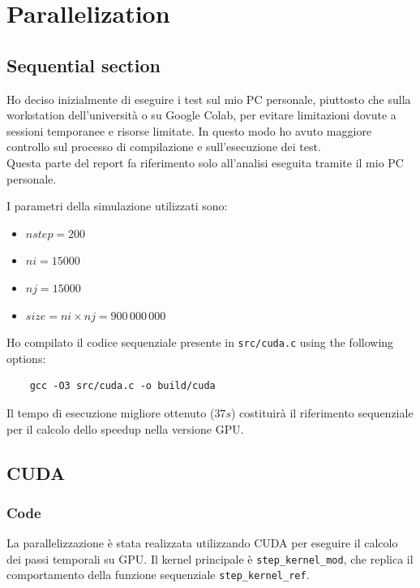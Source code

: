 \newpage
\section{Parallelization}
\label{sec:parallelization}

\subsection{Sequential section}
Ho deciso inizialmente di eseguire i test sul mio PC personale, piuttosto che sulla workstation dell'università o su Google Colab, per evitare limitazioni dovute a sessioni temporanee e risorse limitate. In questo modo ho avuto maggiore controllo sul processo di compilazione e sull'esecuzione dei test.\\

\noindent
Questa parte del report fa riferimento solo all'analisi eseguita tramite il mio PC personale.

\noindent
I parametri della simulazione utilizzati sono:

\begin{itemize}
    \item $nstep = 200$
    \item $ni = 15000$
    \item $nj = 15000$
    \item $size = ni \times nj = 900\,000\,000$
\end{itemize}

\noindent
Ho compilato il codice sequenziale presente in \texttt{src/cuda.c} using the following options:

\begin{verbatim}
    gcc -O3 src/cuda.c -o build/cuda
\end{verbatim}

\noindent
Il tempo di esecuzione migliore ottenuto ($37 s$) costituirà il riferimento sequenziale per il calcolo dello speedup nella versione GPU.

\subsection{CUDA}

\subsubsection{Code}
La parallelizzazione è stata realizzata utilizzando CUDA per eseguire il calcolo dei passi temporali su GPU. Il kernel principale è \texttt{step\_kernel\_mod}, che replica il comportamento della funzione sequenziale \texttt{step\_kernel\_ref}.\\

